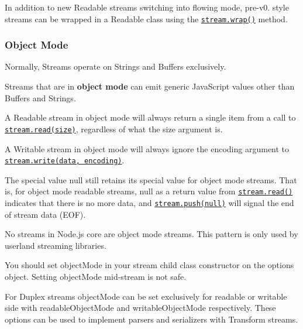 In addition to new Readable streams switching into flowing mode, pre-\/v0. style streams can be wrapped in a Readable class using the \href{#stream_readable_wrap_stream}{\tt {\ttfamily stream.\+wrap()}} method.

\subsubsection*{Object Mode}

Normally, Streams operate on Strings and Buffers exclusively.

Streams that are in {\bfseries object mode} can emit generic Java\+Script values other than Buffers and Strings.

A Readable stream in object mode will always return a single item from a call to \href{#stream_readable_read_size}{\tt {\ttfamily stream.\+read(size)}}, regardless of what the size argument is.

A Writable stream in object mode will always ignore the {\ttfamily encoding} argument to \href{#stream_writable_write_chunk_encoding_callback}{\tt {\ttfamily stream.\+write(data, encoding)}}.

The special value {\ttfamily null} still retains its special value for object mode streams. That is, for object mode readable streams, {\ttfamily null} as a return value from \href{#stream_readable_read_size}{\tt {\ttfamily stream.\+read()}} indicates that there is no more data, and \href{#stream_readable_push_chunk_encoding}{\tt {\ttfamily stream.\+push(null)}} will signal the end of stream data ({\ttfamily E\+OF}).

No streams in Node.\+js core are object mode streams. This pattern is only used by userland streaming libraries.

You should set {\ttfamily object\+Mode} in your stream child class constructor on the options object. Setting {\ttfamily object\+Mode} mid-\/stream is not safe.

For Duplex streams {\ttfamily object\+Mode} can be set exclusively for readable or writable side with {\ttfamily readable\+Object\+Mode} and {\ttfamily writable\+Object\+Mode} respectively. These options can be used to implement parsers and serializers with Transform streams.


